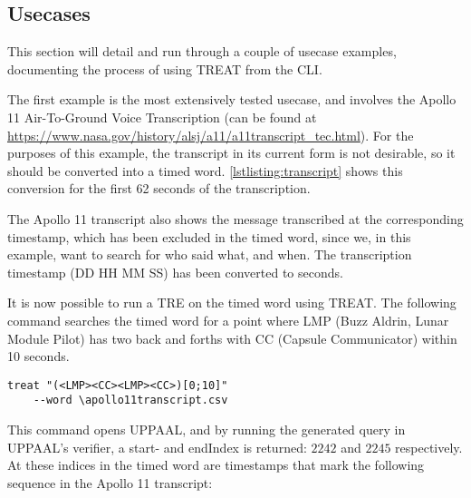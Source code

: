 \subsection{Usecases}\label{subsec:usecases}


This section will detail and run through a couple of usecase examples, documenting the process of using TREAT from the CLI.

\vspace{.5\baselineskip plus 2pt}
The first example is the most extensively tested usecase, and involves the Apollo 11 Air-To-Ground Voice Transcription (can be found at \url{https://www.nasa.gov/history/alsj/a11/a11transcript_tec.html}). For the purposes of this example, the transcript in its current form is not desirable, so it should be converted into a timed word. \cref{lstlisting:transcript} shows this conversion for the first 62 seconds of the transcription.



The Apollo 11 transcript also shows the message transcribed at the corresponding timestamp, which has been excluded in the timed word, since we, in this example, want to search for who said what, and when. The transcription timestamp (DD HH MM SS) has been converted to seconds.

\vspace{.5\baselineskip plus 2pt}
It is now possible to run a TRE on the timed word using TREAT. The following command searches the timed word for a point where LMP (Buzz Aldrin, Lunar Module Pilot) has two back and forths with CC (Capsule Communicator) within 10 seconds.

\vspace{0.75em}
\begin{minipage}{\columnwidth}
    \begin{lstlisting}[basicstyle=\scriptsize\ttfamily]
    treat "(<LMP><CC><LMP><CC>)[0;10]"
    --word \apollo11transcript.csv
            \end{lstlisting}
\end{minipage}
\vspace{-1em}
\label{lstlisting:lmpcctre}
\vspace{0.75em}

This command opens UPPAAL, and by running the generated query in UPPAAL's verifier, a start- and endIndex is returned: $2242$ and $2245$ respectively. At these indices in the timed word are timestamps that mark the following sequence in the Apollo 11 transcript:

